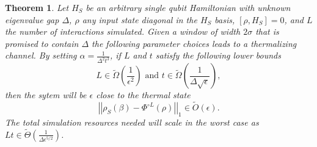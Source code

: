 \documentclass{article}
\newtheorem{theorem}{Theorem}
\newcommand{\norm}[1]{\left| \left| #1 \right| \right|}
\newcommand{\bigotilde}[1]{\widetilde{O} \left( #1 \right)}
\begin{document}
\begin{theorem} \label{thm:single_qubit}
    Let $H_S$ be an arbitrary single qubit Hamiltonian with unknown eigenvalue gap $\Delta$, $\rho$ any input state diagonal in the $H_S$ basis, $[\rho, H_S] = 0$, and $L$ the number of interactions simulated. Given a window of width $2 \sigma$ that is promised to contain $\Delta$ the following parameter choices leads to a thermalizing channel. By setting $\alpha = \frac{1}{\Delta^2 t^3}$, if $L$ and $t$ satisfy the following lower bounds
    \begin{equation}
        L \in \widetilde{\Omega} \left(\frac{1}{\epsilon^2} \right) \text{ and } t \in \widetilde{\Omega} \left(\frac{1}{\Delta \sqrt{\epsilon}} \right),
    \end{equation}
    then the sytem will be $\epsilon$ close to the thermal state
    \begin{equation}
        \norm{\rho_S(\beta) - \Phi^{\circ L}(\rho)}_1 \in \bigotilde{\epsilon}.
    \end{equation}
    The total simulation resources needed will scale in the worst case as $Lt \in \widetilde{\Theta}\left( \frac{1}{\Delta \epsilon^{5/2}} \right)$. 
\end{theorem}
\end{document}
